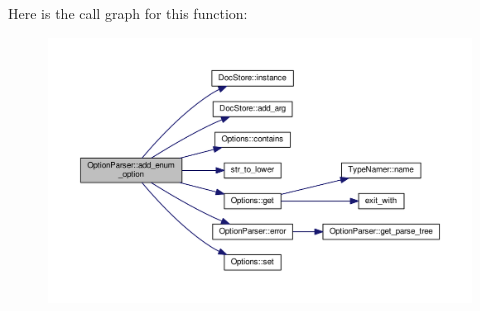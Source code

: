 Here is the call graph for this function\-:
\nopagebreak
\begin{figure}[H]
\begin{center}
\leavevmode
\includegraphics[width=350pt]{classOptionParser_a903c91ec09488a50cc3faa9b5257d1de_cgraph}
\end{center}
\end{figure}



